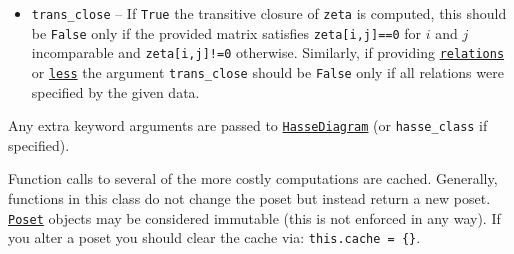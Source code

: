 \documentclass[12pt]{article}
\begin{document}
{{\begin{itemize}
{                The default value is \hyperlink{HasseDiagram}{\texttt{HasseDiagram}}.
        }
        \item[]{
        \verb|trans_close| -- If \verb|True| the transitive closure of \verb|zeta| is
                computed, this should be \verb|False| only if the provided matrix satisfies
                \verb|zeta[i,j]==0| for $i$ and $j$ incomparable and \verb|zeta[i,j]!=0| otherwise.
                Similarly, if providing \hyperlink{Poset.relations}{\texttt{relations}} or \hyperlink{Poset.less}{\texttt{less}} the argument \verb|trans_close| should be \verb|False|
                only if all relations were specified by the
                given data.
        }
\end{itemize}
Any extra keyword arguments are passed to \hyperlink{HasseDiagram}{\texttt{HasseDiagram}} (or \verb|hasse_class|
if specified).


Function calls to several of the more costly computations are cached. Generally,
functions in this class do not change the poset but instead return a new poset.
\hyperlink{Poset}{\texttt{Poset}} objects may be considered immutable (this is not enforced in any way).
If you alter a poset you should clear the cache via: \verb|this.cache = {}|.



}\endlist}
\end{document}

